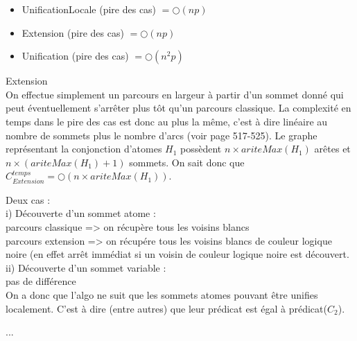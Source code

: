 \begin{itemize}
	\item UnificationLocale (pire des cas) $= \bigcirc(np)$
	\item Extension (pire des cas) $= \bigcirc(np)$
	\item Unification (pire des cas) $= \bigcirc(n^{2}p)$
\end{itemize}

Extension\\
On effectue simplement un parcours en largeur \`a partir d'un sommet donn\'e qui peut \'eventuellement s'arr\^eter plus
t\^ot qu'un parcours classique. La complexit\'e en temps dans le pire des cas est donc au plus la m\^eme, c'est \`a dire lin\'eaire
au nombre de sommets plus le nombre d'arcs (voir \cite{algorithmique} page 517-525).
Le graphe repr\'esentant la conjonction d'atomes $H_{1}$ poss\`edent $n \times ariteMax(H_{1})$ ar\^etes
et $n \times (ariteMax(H_{1}) + 1)$ sommets.
On sait donc que $C_{Extension}^{temps} = \bigcirc(n \times ariteMax(H_1))$.


Deux cas :\\
	i) D\'ecouverte d'un sommet atome : \\
		parcours classique => on r\'ecup\`ere tous les voisins blancs \\
		parcours extension => on r\'ecup\'ere tous les voisins blancs de couleur logique noire (en effet arr\^et imm\'ediat si un voisin de couleur logique noire est d\'ecouvert.\\
	ii) D\'ecouverte d'un sommet variable :\\
		pas de diff\'erence\\
On a donc que l'algo ne suit que les sommets atomes pouvant \^etre unifies localement. C'est \`a dire (entre autres) que leur pr\'edicat est \'egal \`a pr\'edicat($C_{2}$).



...




